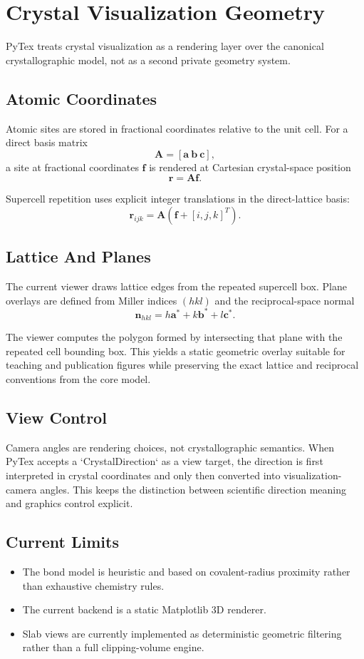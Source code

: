 \section{Crystal Visualization Geometry}

PyTex treats crystal visualization as a rendering layer over the canonical crystallographic model, not as a second private geometry system.

\subsection{Atomic Coordinates}

Atomic sites are stored in fractional coordinates relative to the unit cell. For a direct basis matrix
\[
\mathbf{A} = [\mathbf{a}\ \mathbf{b}\ \mathbf{c}],
\]
a site at fractional coordinates $\mathbf{f}$ is rendered at Cartesian crystal-space position
\[
\mathbf{r} = \mathbf{A}\mathbf{f}.
\]

Supercell repetition uses explicit integer translations in the direct-lattice basis:
\[
\mathbf{r}_{ijk} = \mathbf{A}(\mathbf{f} + [i, j, k]^T).
\]

\subsection{Lattice And Planes}

The current viewer draws lattice edges from the repeated supercell box. Plane overlays are defined from Miller indices $(hkl)$ and the reciprocal-space normal
\[
\mathbf{n}_{hkl} = h \mathbf{a}^{*} + k \mathbf{b}^{*} + l \mathbf{c}^{*}.
\]

The viewer computes the polygon formed by intersecting that plane with the repeated cell bounding box. This yields a static geometric overlay suitable for teaching and publication figures while preserving the exact lattice and reciprocal conventions from the core model.

\subsection{View Control}

Camera angles are rendering choices, not crystallographic semantics. When PyTex accepts a `CrystalDirection` as a view target, the direction is first interpreted in crystal coordinates and only then converted into visualization-camera angles. This keeps the distinction between scientific direction meaning and graphics control explicit.

\subsection{Current Limits}

\begin{itemize}
  \item The bond model is heuristic and based on covalent-radius proximity rather than exhaustive chemistry rules.
  \item The current backend is a static Matplotlib 3D renderer.
  \item Slab views are currently implemented as deterministic geometric filtering rather than a full clipping-volume engine.
\end{itemize}
